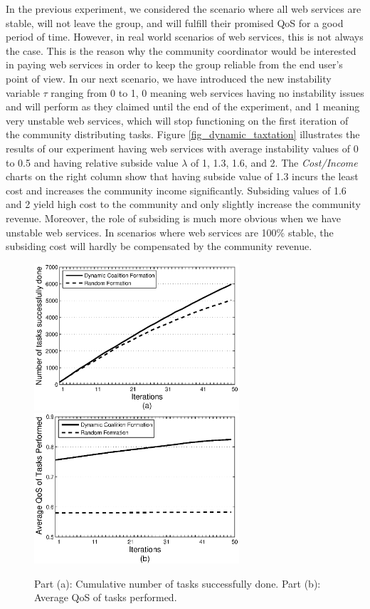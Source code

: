 \documentclass[10pt,journal,cspaper,compsoc]{IEEEtran}
\begin{document}
In the previous experiment, we considered the scenario where all
web services are stable, will not leave the group, and will
fulfill their promised QoS for a good period of time. However, in
real world scenarios of web services, this is not always the case.
This is the reason why the community coordinator would be interested in paying
web services in order to keep the group reliable from the end
user's point of view. In our next scenario, we have introduced the
new instability variable $\tau$ ranging from 0 to 1, 0 meaning web
services having no instability issues and will perform as they
claimed until the end of the experiment, and 1 meaning very
unstable web services, which will stop functioning on the first
iteration of the community distributing tasks. Figure
\ref{fig_dynamic_taxtation} illustrates the results of our
experiment having web services with average instability values of
0 to 0.5 and having relative subside value $\lambda$ of 1, 1.3,
1.6, and 2. The \emph{Cost/Income} charts on the right column show
that having subside value of 1.3 incurs the least cost and
increases the community income significantly. Subsiding values of
1.6 and 2 yield high cost to the community and only slightly
increase the community revenue. Moreover, the role of subsiding is
much more obvious when we have unstable web services. In scenarios
where web services are 100\% stable, the subsiding cost will
hardly be compensated by the community revenue.

\begin{figure}[!t]
\centering
\includegraphics[width=3in]{s2_task_done.eps}
\includegraphics[width=3in]{s2_task_qos.eps}
\caption{Part (a): Cumulative number of tasks successfully done.
Part (b): Average QoS of tasks performed.} \label{performancemany}
\end{figure}
\end{document}
